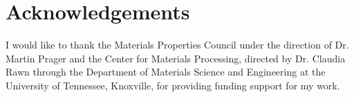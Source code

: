 \chapter*{Acknowledgements}
I would like to thank the Materials Properties Council under the direction of Dr. Martin Prager and the Center for Materials Processing, directed by Dr. Claudia Rawn through the Department of Materials Science and Engineering at the University of Tennessee, Knoxville, for providing funding support for my work. 